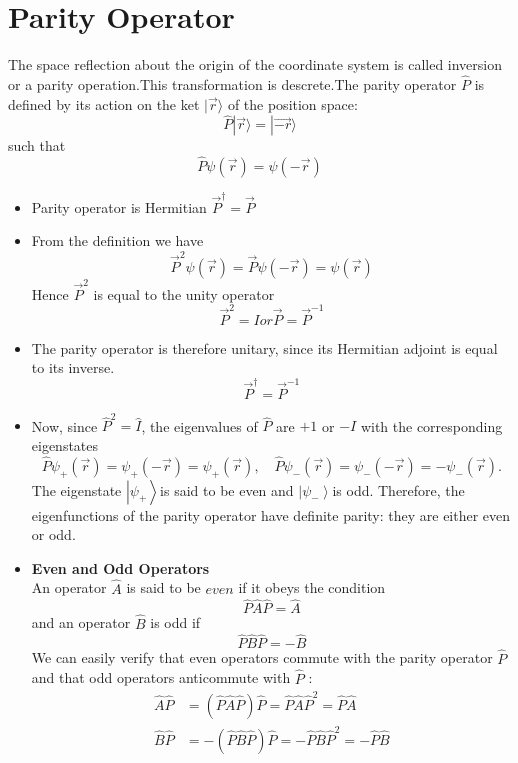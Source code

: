\section{Parity Operator}
The space reflection about the origin of the coordinate system is called inversion or a parity operation.This transformation is descrete.The parity operator $\hat{P}$ is defined by its action on the ket $|\vec{r}\rangle$ of the position space:
$$\hat{P}|\vec{r}\rangle =|\vec{-r}\rangle$$
such that 
 $$\hat{P}\psi(\vec{r})=\psi(-\vec{r})$$
 \begin{note}
 	\begin{itemize}
 		\item Parity operator is Hermitian $\vec{P}^{\dagger}=\vec{P}$
 		\item From the definition we have\\
 		$$\vec{P}^2 \psi(\vec{r})=\vec{P}\psi(-\vec{r})=\psi(\vec{r})$$
 		Hence $\vec{P}^2$ is equal to the unity operator
 		$$\vec{P}^2=I or \vec{P}=\vec{P}^{-1}$$
 		\item The parity operator is therefore unitary, since its Hermitian adjoint is equal to its inverse.\\
 		$$\vec{P}^{\dagger}=\vec{P}^{-1}$$ 
 		\item Now, since $\hat{P}^{2}=\hat{I}$, the eigenvalues of $\hat{P}$ are $+1$ or $-I$ with the corresponding eigenstates
 		$$
 		\hat{P} \psi_{+}(\vec{r})=\psi_{+}(-\vec{r})=\psi_{+}(\vec{r}), \quad \hat{P} \psi_{-}(\vec{r})=\psi_{-}(-\vec{r})=-\psi_{-}(\vec{r}) .
 		$$
 		The eigenstate $\left|\psi_{+}\right\rangle$is said to be even and $\left|\psi_{-}\right\rangle$is odd. Therefore, the eigenfunctions of the parity operator have definite parity: they are either even or odd.\\
 		\item \textbf{Even and Odd Operators}\\
 		An operator $\hat{A}$ is said to be $e v e n$ if it obeys the condition
 		$$
 		\hat{P} \hat{A} \hat{P}=\hat{A}
 		$$
 		and an operator $\hat{B}$ is odd if
 		$$
 		\hat{P} \hat{B} \hat{P}=-\hat{B}
 		$$
 		We can easily verify that even operators commute with the parity operator $\hat{P}$ and that odd operators anticommute with $\hat{P}$ :
 		$$
 		\begin{aligned}
 		\hat{A} \hat{P} &=(\hat{P} \hat{A} \hat{P}) \hat{P}=\hat{P} \hat{A} \hat{P}^{2}=\hat{P}\hat{A} \\
 		\hat{B} \hat{P} &=-(\hat{P} \hat{B} \hat{P}) \hat{P}=-\hat{P} \hat{B} \hat{P}^{2}=-\hat{P} \hat{B}
 		\end{aligned}
 		$$
 	\end{itemize}
 \end{note}

